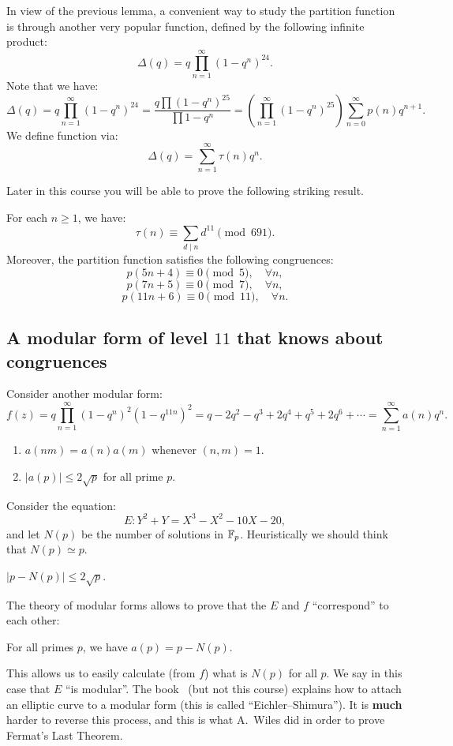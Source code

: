 In view of the previous lemma, a convenient way to study the partition function is through another
very popular function, defined by the following infinite product:
\[
\Delta(q) = q\prod_{n=1}^\infty (1-q^n)^{24}.
\]
Note that we have:
\[
\Delta(q) = q\prod_{n=1}^\infty (1-q^n)^{24} = \frac{q\prod(1-q^n)^{25}}{\prod 1-q^n} = \left(\prod_{n=1}^\infty(1-q^n)^{25}\right) \sum_{n=0}^\infty p(n)q^{n+1}.
\]
We define  function via:
\[
\Delta(q)=\sum_{n=1}^{\infty} \tau(n)q^n.
\]

Later in this course you will be able to prove the following striking result.
\begin{theorem}[Ramanujan]
For each $n\geq 1$, we have:
\[
\tau(n)\equiv \sum_{d\mid n} d^{11}\pmod{691}.
\]
Moreover, the partition function satisfies the following congruences:
\[
p(5n+4) \equiv 0\pmod{5},\quad \forall n,
\]
\[
p(7n+5) \equiv 0\pmod{7},\quad \forall n,
\]
\[
p(11n+6) \equiv 0\pmod{11},\quad \forall n.
\]

\end{theorem}
\subsection{A modular form of level \texorpdfstring{$11$}{11} that knows about congruences}
  Consider another modular form:
\[
f(z)=q\prod_{n=1}^\infty (1-q^n)^2(1-q^{11n})^2 = q-2q^2-q^3+2q^4+q^5+2q^6+\cdots = \sum_{n=1}^\infty a(n)q^n.
\]
\begin{theorem}
  \begin{enumerate}
  \item $a(nm) = a(n)a(m)$ whenever $(n,m)=1$.
  \item $|a(p)|\leq 2\sqrt{p}$ for all prime $p$.
  \end{enumerate}
\end{theorem}
Consider the equation:
\[
E\colon Y^2+Y=X^3-X^2-10X-20,
\]
and let $N(p)$ be the number of solutions in $\mathbb{F}_p$. Heuristically we should think that $N(p)\simeq p$.
\begin{theorem}[Hasse]
  $|p-N(p)|\leq 2\sqrt{p}$.
\end{theorem}

The theory of modular forms allows to prove that the $E$ and $f$ ``correspond'' to each other:
\begin{theorem}
For all primes $p$, we have $a(p) = p - N(p)$.
\end{theorem}
This allows us to easily calculate (from $f$) what is $N(p)$ for all $p$. We say in this case that $E$ ``is modular''. The book~\cite{diamond-shurman} (but not this course) explains how to attach an elliptic curve to a modular form (this is called ``Eichler--Shimura''). It is \textbf{much} harder to reverse this process, and this is what A.~Wiles did in order to prove Fermat's Last Theorem.

